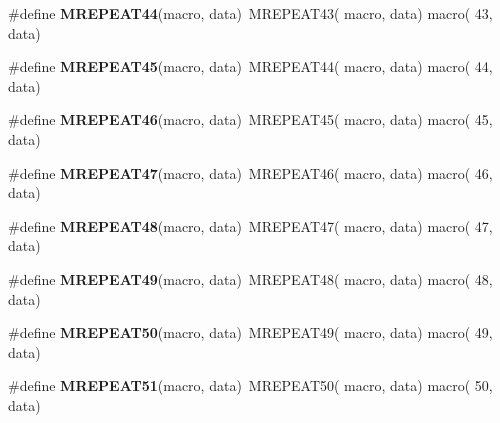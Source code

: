 \begin{DoxyCompactItemize}
\item 
\hypertarget{group__group__sam0__utils__mrepeat_ga2b24fe07a9548203e922430255d5dba1}{}\#define {\bfseries M\+R\+E\+P\+E\+A\+T44}(macro,  data)~M\+R\+E\+P\+E\+A\+T43( macro, data)   macro( 43, data)\label{group__group__sam0__utils__mrepeat_ga2b24fe07a9548203e922430255d5dba1}

\item 
\hypertarget{group__group__sam0__utils__mrepeat_ga98af56829d52d667c77077948d324447}{}\#define {\bfseries M\+R\+E\+P\+E\+A\+T45}(macro,  data)~M\+R\+E\+P\+E\+A\+T44( macro, data)   macro( 44, data)\label{group__group__sam0__utils__mrepeat_ga98af56829d52d667c77077948d324447}

\item 
\hypertarget{group__group__sam0__utils__mrepeat_gaaa292eca5c75fc09e042a941b69e077c}{}\#define {\bfseries M\+R\+E\+P\+E\+A\+T46}(macro,  data)~M\+R\+E\+P\+E\+A\+T45( macro, data)   macro( 45, data)\label{group__group__sam0__utils__mrepeat_gaaa292eca5c75fc09e042a941b69e077c}

\item 
\hypertarget{group__group__sam0__utils__mrepeat_ga31b4cab8f91fc3ca6dbb6d4d501edc3c}{}\#define {\bfseries M\+R\+E\+P\+E\+A\+T47}(macro,  data)~M\+R\+E\+P\+E\+A\+T46( macro, data)   macro( 46, data)\label{group__group__sam0__utils__mrepeat_ga31b4cab8f91fc3ca6dbb6d4d501edc3c}

\item 
\hypertarget{group__group__sam0__utils__mrepeat_ga37c9d35afe9f5aa1eb274a590afeae75}{}\#define {\bfseries M\+R\+E\+P\+E\+A\+T48}(macro,  data)~M\+R\+E\+P\+E\+A\+T47( macro, data)   macro( 47, data)\label{group__group__sam0__utils__mrepeat_ga37c9d35afe9f5aa1eb274a590afeae75}

\item 
\hypertarget{group__group__sam0__utils__mrepeat_ga0b8f49d449884ed9753850305fd1e31f}{}\#define {\bfseries M\+R\+E\+P\+E\+A\+T49}(macro,  data)~M\+R\+E\+P\+E\+A\+T48( macro, data)   macro( 48, data)\label{group__group__sam0__utils__mrepeat_ga0b8f49d449884ed9753850305fd1e31f}

\item 
\hypertarget{group__group__sam0__utils__mrepeat_gac25633a97dd40a5eec980d04c51d960d}{}\#define {\bfseries M\+R\+E\+P\+E\+A\+T50}(macro,  data)~M\+R\+E\+P\+E\+A\+T49( macro, data)   macro( 49, data)\label{group__group__sam0__utils__mrepeat_gac25633a97dd40a5eec980d04c51d960d}

\item 
\hypertarget{group__group__sam0__utils__mrepeat_ga6818ebdd66a3249479701fa34a7994e8}{}\#define {\bfseries M\+R\+E\+P\+E\+A\+T51}(macro,  data)~M\+R\+E\+P\+E\+A\+T50( macro, data)   macro( 50, data)\label{group__group__sam0__utils__mrepeat_ga6818ebdd66a3249479701fa34a7994e8}


\end{DoxyCompactItemize}
